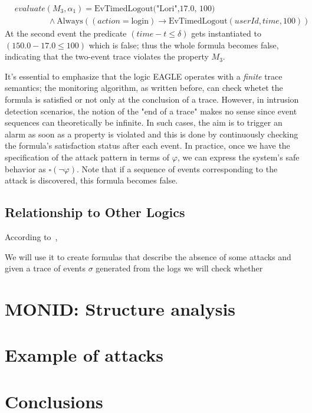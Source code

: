 \documentclass[english]{article}
\begin{document}
\begin{align*}
    &evaluate(M_3,\alpha_1)  = \text{EvTimedLogout("Lori",17.0, 100)} \\ 
    &\quad\quad\quad\quad \land\text{Always}((action = \text{login}) \rightarrow \text{EvTimedLogout}(userId,time, 100))
\end{align*}
At the second event the predicate $(time-t \leq \delta)$ gets instantiated to $(150.0-17.0 \leq 100)$ which is false; thus the whole formula becomes false, indicating that the two-event trace violates the property $M_3$. 

It's essential to emphasize that the logic EAGLE operates with a \textit{finite} trace semantics; the monitoring algorithm, as written before, can check whetet the formula is satisfied or not only at the conclusion of a trace. However, in intrusion detection scenarios, the notion of the "end of a trace" makes no sense since event sequences can theoretically be infinite. In such cases, the aim is to trigger an alarm as soon as a property is violated and this is done by continuously checking the formula's satisfaction status after each event. In practice, once we have the specification of the attack pattern in terms of $\varphi$, we can express the system's safe behavior as $\square(\neg \varphi)$. Note that if a sequence of events corresponding to the attack is discovered, this formula becomes false.

\subsection{Relationship to Other Logics}
According to~\cite{barringer2004rule},

We will use it to create formulas that describe the absence of some attacks and given a trace of events $\sigma$ generated from the logs we will check whether 

\section{MONID: Structure analysis}

\section{Example of attacks}

\section{Conclusions}

\printbibliography
\end{document}
